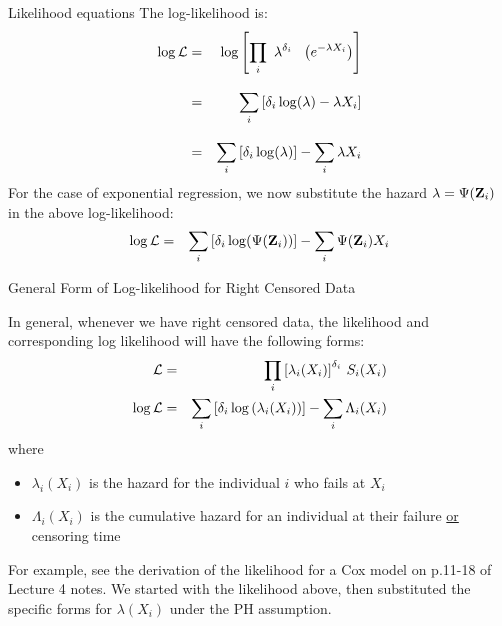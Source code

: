 \documentclass[envcountsect, 10pt, portrait, palatino]{beamer}
\newcommand{\bfZ}{{\mbox{{\bf Z}}}}
\begin{document}
\begin{frame}{Likelihood equations}
The log-likelihood is:
\begin{eqnarray*}
\log {\cal L} & = &
\log \left[\prod_i ~
\lambda^{\delta_i} ~~\left(e^{-\lambda X_i}\right)\right]\\[2ex]
& = & \sum_i \left[\delta_i \log(\lambda) - \lambda X_i\right]\\[2ex]
& = & \sum_i \left[\delta_i \log(\lambda)\right] - \sum_i \lambda X_i
\end{eqnarray*}
For the case of exponential regression, we now substitute the
hazard $\lambda=\Psi(\bfZ_i)$ in the above log-likelihood:
\begin{eqnarray}
\log {\cal L} & = &
\sum_i \left[\delta_i \log(\Psi(\bfZ_i))\right] - \sum_i \Psi(\bfZ_i) X_i
\label{loglik}
\end{eqnarray}
\end{frame} 
\begin{frame}{General Form of Log-likelihood for Right Censored Data}

In general, whenever we have right censored data, the likelihood and
corresponding log likelihood will have the following forms:
\begin{eqnarray*}
{\cal L} & = &\prod_i \left[\lambda_i(X_i)\right]^{\delta_i} \, S_i(X_i)\\
\log {\cal L} & = &
\sum_i \left[\delta_i \log{(\lambda_i(X_i))}\right] - \sum_i \Lambda_i(X_i)
\end{eqnarray*}
where
\begin{itemize}
\item $\lambda_i(X_i)$ is the hazard for the individual $i$ who
fails at $X_i$
\item $\Lambda_i(X_i)$ is the cumulative hazard for an individual
at their failure \underline{or} censoring time
\end{itemize}
For example, see the derivation of the likelihood for a Cox model on
p.11-18 of Lecture 4 notes.  We started with the likelihood above,
then substituted the specific forms for $\lambda(X_i)$ under the PH
assumption.
\end{frame} 
\end{document}
